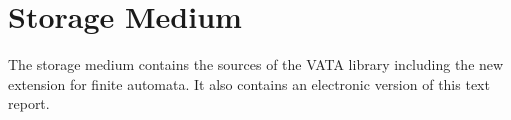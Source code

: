 \chapter{Storage Medium}
The storage medium contains the sources of the VATA library including the new extension for finite automata. It also contains an electronic version of 
this text report.

